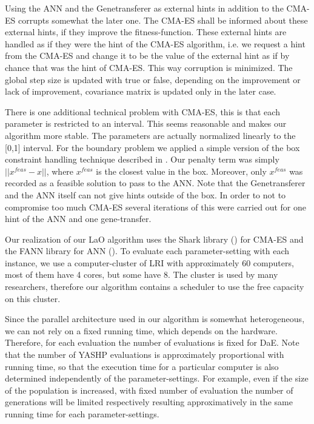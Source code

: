 \documentclass{acm_proc_article-sp}
\begin{document}
Using the ANN and the Genetransferer as external hints in addition to the CMA-ES corrupts somewhat the later one. The CMA-ES shall be informed about these external hints, if they improve the fitness-function. These external hints are handled as if they were the hint of the CMA-ES algorithm, i.e. we request a hint from the CMA-ES and change it to be the value of the external hint as if by chance that was the hint of CMA-ES. This way corruption is minimized. The global step size is updated with true or false, depending on the improvement or lack of improvement, covariance matrix is updated only in the later case.

There is one additional technical problem with CMA-ES, this is that each parameter is restricted to an interval. This seems reasonable and makes our algorithm more stable. The parameters are actually normalized linearly to the [0,1] interval. For the boundary problem we applied a simple version of the box constraint handling technique described in \cite{hansen2009tec}. Our penalty term was simply \begin{math}||x^{feas}-x|| \end{math}, where \begin{math}x^{feas}\end{math} is the closest value in the box. Moreover, only \begin{math}x^{feas}\end{math} was recorded as a feasible solution to pass to the ANN. Note that the Genetransferer and the ANN itself can not give hints outside of the box. In order to not to compromise too much CMA-ES several iterations of this were carried out for one hint of the ANN and one gene-transfer.

Our realization of our LaO algorithm uses the Shark library (\cite{shark08}) for CMA-ES and the FANN library for ANN (\cite{nissen}). To evaluate each parameter-setting with each instance, we use a computer-cluster of LRI with approximately 60 computers, most of them have 4 cores, but some have 8. The cluster is used by many researchers, therefore our algorithm contains a scheduler to use the free capacity on this cluster.

Since the parallel architecture used in our algorithm is somewhat heterogeneous, we can not rely on a fixed running time, which depends on the hardware. Therefore, for each evaluation the number of evaluations is fixed for DaE. Note that the number of YASHP evaluations is approximately proportional with running time, so that the execution time for a particular computer is also determined independently of the parameter-settings. For example, even if the size of the population is increased, with fixed number of evaluation the number of generations will be limited respectively resulting approximatively in the same running time for each parameter-settings. 
\end{document}

